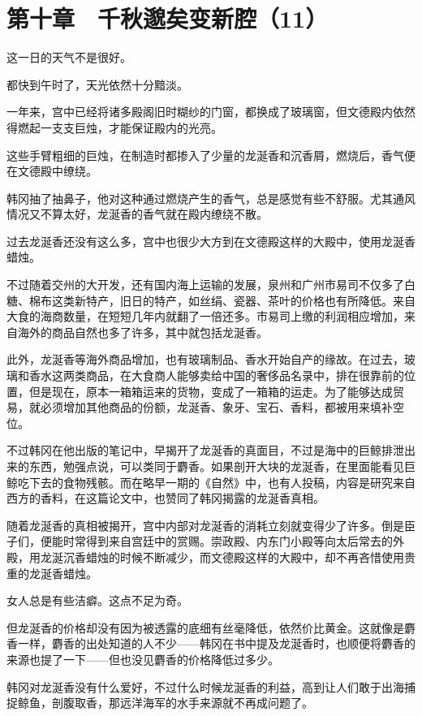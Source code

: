 \section{第十章　千秋邈矣变新腔（11）}

这一日的天气不是很好。

都快到午时了，天光依然十分黯淡。

一年来，宫中已经将诸多殿阁旧时糊纱的门窗，都换成了玻璃窗，但文德殿内依然得燃起一支支巨烛，才能保证殿内的光亮。

这些手臂粗细的巨烛，在制造时都掺入了少量的龙涎香和沉香屑，燃烧后，香气便在文德殿中缭绕。

韩冈抽了抽鼻子，他对这种通过燃烧产生的香气，总是感觉有些不舒服。尤其通风情况又不算太好，龙涎香的香气就在殿内缭绕不散。

过去龙涎香还没有这么多，宫中也很少大方到在文德殿这样的大殿中，使用龙涎香蜡烛。

不过随着交州的大开发，还有国内海上运输的发展，泉州和广州市易司不仅多了白糖、棉布这类新特产，旧日的特产，如丝绢、瓷器、茶叶的价格也有所降低。来自大食的海商数量，在短短几年内就翻了一倍还多。市易司上缴的利润相应增加，来自海外的商品自然也多了许多，其中就包括龙涎香。

此外，龙涎香等海外商品增加，也有玻璃制品、香水开始自产的缘故。在过去，玻璃和香水这两类商品，在大食商人能够卖给中国的奢侈品名录中，排在很靠前的位置，但是现在，原本一箱箱运来的货物，变成了一箱箱的运走。为了能够达成贸易，就必须增加其他商品的份额，龙涎香、象牙、宝石、香料，都被用来填补空位。

不过韩冈在他出版的笔记中，早揭开了龙涎香的真面目，不过是海中的巨鲸排泄出来的东西，勉强点说，可以类同于麝香。如果剖开大块的龙涎香，在里面能看见巨鲸吃下去的食物残骸。而在略早一期的《自然》中，也有人投稿，内容是研究来自西方的香料，在这篇论文中，也赞同了韩冈揭露的龙涎香真相。

随着龙涎香的真相被揭开，宫中内部对龙涎香的消耗立刻就变得少了许多。倒是臣子们，便能时常得到来自宫廷中的赏赐。崇政殿、内东门小殿等向太后常去的外殿，用龙涎沉香蜡烛的时候不断减少，而文德殿这样的大殿中，却不再吝惜使用贵重的龙涎香蜡烛。

女人总是有些洁癖。这点不足为奇。

但龙涎香的价格却没有因为被透露的底细有丝毫降低，依然价比黄金。这就像是麝香一样，麝香的出处知道的人不少——韩冈在书中提及龙涎香时，也顺便将麝香的来源也提了一下——但也没见麝香的价格降低过多少。

韩冈对龙涎香没有什么爱好，不过什么时候龙涎香的利益，高到让人们敢于出海捕捉鲸鱼，剖腹取香，那远洋海军的水手来源就不再成问题了。

